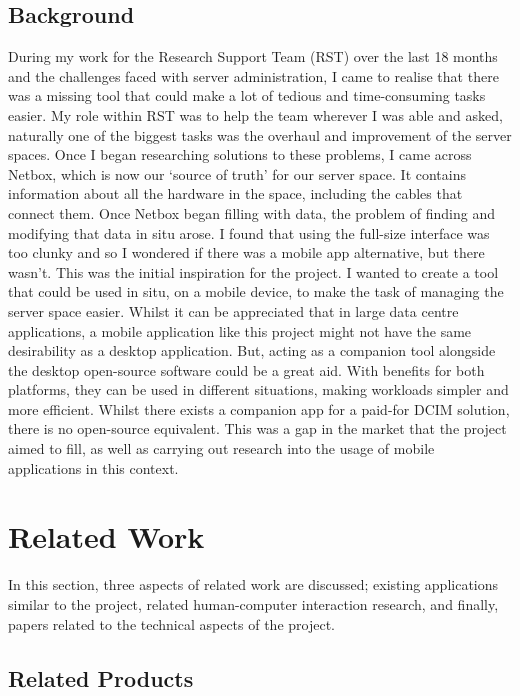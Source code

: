 \documentclass [11pt,a4paper]{article}
\begin{document}
\subsection{Background}
\label{sec:background}
During my work for the Research Support Team (RST) over the last 18 months and the challenges faced with server administration, I came to realise that there was a missing tool that could make a lot of tedious and time-consuming tasks easier. My role within RST was to help the team wherever I was able and asked, naturally one of the biggest tasks was the overhaul and improvement of the server spaces. Once I began researching solutions to these problems, I came across Netbox, which is now our `source of truth' for our server space. It contains information about all the hardware in the space, including the cables that connect them. Once Netbox began filling with data, the problem of finding and modifying that data in situ arose. I found that using the full-size interface was too clunky and so I wondered if there was a mobile app alternative, but there wasn't. This was the initial inspiration for the project. I wanted to create a tool that could be used in situ, on a mobile device, to make the task of managing the server space easier. Whilst it can be appreciated that in large data centre applications, a mobile application like this project might not have the same desirability as a desktop application. But, acting as a companion tool alongside the desktop open-source software could be a great aid. With benefits for both platforms, they can be used in different situations, making workloads simpler and more efficient. Whilst there exists a companion app for a paid-for DCIM solution, there is no open-source equivalent. This was a gap in the market that the project aimed to fill, as well as carrying out research into the usage of mobile applications in this context.

\pagebreak

\section{Related Work}

In this section, three aspects of related work are discussed; existing applications similar to the project, related human-computer interaction research, and finally, papers related to the technical aspects of the project.

\subsection{Related Products}
\label{sec:app_reviews}
\end{document}
